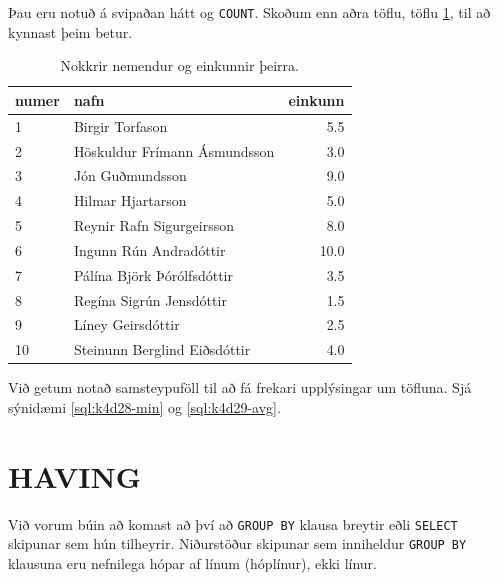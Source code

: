 Þau eru notuð á svipaðan hátt og \verb|COUNT|. Skoðum enn aðra töflu, töflu \ref{tafla:einkunnir}, til að kynnast þeim betur.

\begin{table}
\centering
\caption[Einkunnir]{Nokkrir nemendur og einkunnir þeirra.}
\label{tafla:einkunnir}
\begin{tabular}{llr}
\toprule
numer&nafn&einkunn\\
\midrule
1&Birgir Torfason&5.5\\
2&Höskuldur Frímann Ásmundsson&3.0\\
3&Jón Guðmundsson&9.0\\
4&Hilmar Hjartarson&5.0\\
5&Reynir Rafn Sigurgeirsson&8.0\\
6&Ingunn Rún Andradóttir&10.0\\
7&Pálína Björk Þórólfsdóttir&3.5\\
8&Regína Sigrún Jensdóttir&1.5\\
9&Líney Geirsdóttir&2.5\\
10&Steinunn Berglind Eiðsdóttir&4.0\\
\bottomrule
\end{tabular}
\end{table}

Við getum notað samsteypuföll til að fá frekari upplýsingar um töfluna. Sjá sýnidæmi \ref{sql:k4d28-min} og \ref{sql:k4d29-avg}.


\clearpage
\begin{example}
\caption[AVG fallið]{\emph{SELECT} skipun sem finnur meðaleinkunnina í einkunnatöflunni. Hún finnur gildið $5.2$.}
\label{sql:k4d29-avg}
\centering
{}
\end{example}

\section{HAVING}
\label{undirkafli:having}
Við vorum búin að komast að því að \verb|GROUP BY| klausa breytir eðli \verb|SELECT| skipunar sem hún tilheyrir. Niðurstöður skipunar sem inniheldur \verb|GROUP BY| klausuna eru nefnilega hópar af línum (hóplínur), ekki línur.

